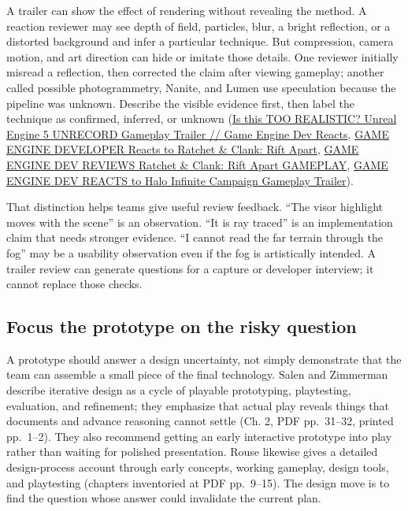 A trailer can show the effect of rendering without revealing the method. A reaction reviewer may see depth of field, particles, blur, a bright reflection, or a distorted background and infer a particular technique. But compression, camera motion, and art direction can hide or imitate those details. One reviewer initially misread a reflection, then corrected the claim after viewing gameplay; another called possible photogrammetry, Nanite, and Lumen use speculation because the pipeline was unknown. Describe the visible evidence first, then label the technique as confirmed, inferred, or unknown (\href{https://www.youtube.com/watch?v=p4aAMPtNIsQ&t=0m0s}{Is this TOO REALISTIC? Unreal Engine 5 UNRECORD Gameplay Trailer // Game Engine Dev Reacts}, \href{https://www.youtube.com/watch?v=qCSyy5BTDuc&t=0m0s}{GAME ENGINE DEVELOPER Reacts to Ratchet \& Clank: Rift Apart}, \href{https://www.youtube.com/watch?v=d5_9EEfN-Mw&t=0m0s}{GAME ENGINE DEV REVIEWS Ratchet \& Clank: Rift Apart GAMEPLAY}, \href{https://www.youtube.com/watch?v=HWtEcbiuLBQ&t=0m0s}{GAME ENGINE DEV REACTS to Halo Infinite \textbar{} Campaign Gameplay Trailer}).

That distinction helps teams give useful review feedback. ``The visor highlight moves with the scene'' is an observation. ``It is ray traced'' is an implementation claim that needs stronger evidence. ``I cannot read the far terrain through the fog'' may be a usability observation even if the fog is artistically intended. A trailer review can generate questions for a capture or developer interview; it cannot replace those checks.

\subsection{Focus the prototype on the risky question}\label{05-engine-i-ch009-focus-the-prototype-on-the-risky-question}

\hypertarget{05-engine-i-ch009-focus-the-prototype-on-the-risky-question}{}

A prototype should answer a design uncertainty, not simply demonstrate that the team can assemble a small piece of the final technology. Salen and Zimmerman describe iterative design as a cycle of playable prototyping, playtesting, evaluation, and refinement; they emphasize that actual play reveals things that documents and advance reasoning cannot settle (Ch. 2, PDF pp.~31--32, printed pp.~1--2). They also recommend getting an early interactive prototype into play rather than waiting for polished presentation. Rouse likewise gives a detailed design-process account through early concepts, working gameplay, design tools, and playtesting (chapters inventoried at PDF pp.~9--15). The design move is to find the question whose answer could invalidate the current plan.


